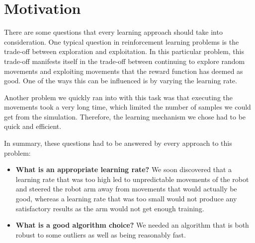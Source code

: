 \section{Motivation} \label{sec:motivation}

There are some questions that every learning approach should take into consideration. One typical question in reinforcement learning problems is the trade-off between exploration and exploitation. In this particular problem, this trade-off manifests itself in the trade-off between continuing to explore random movements and exploiting movements that the reward function has deemed as good. One of the ways this can be influenced is by varying the learning rate.

Another problem we quickly ran into with this task was that executing the movements took a very long time, which limited the number of samples we could get from the simulation. Therefore, the learning mechanism we chose had to be quick and efficient. 

In summary, these questions had to be answered by every approach to this problem:

\begin{itemize}
	\item \textbf{What is an appropriate learning rate?} We soon discovered that a learning rate that was too high led to unpredictable movements of the robot and steered the robot arm away from movements that would actually be good, whereas a learning rate that was too small would not produce any satisfactory results as the arm would not get enough training.
	\item \textbf{What is a good algorithm choice?} We needed an algorithm that is both robust to some outliers as well as being reasonably fast.
\end{itemize}
